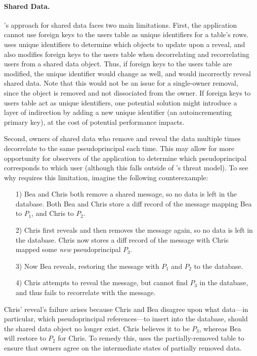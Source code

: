 \paragraph{Shared Data.}
\sys's approach for shared data faces two main limitations. First, the
application cannot use foreign keys to the users table as unique identifiers for
a table's rows. \sys uses unique identifiers to determine which objects to
update upon a reveal, and also modifies foreign keys to the users table when
decorrelating and recorrelating users from a shared data object. Thus, if
foreign keys to the users table are modified, the unique identifier would change
as well, and \sys would incorrectly reveal shared data.
%
Note that this would not be an issue for a single-owner removal, since the
object is removed and not dissociated from the owner.
%
If foreign keys to users table act as unique identifiers, one potential solution
might introduce a layer of indirection by adding a new unique identifier (\eg an
autoincrementing primary key), at the cost of potential performance impacts.

Second, owners of shared data who remove and reveal the data multiple times 
decorrelate to the same pseudoprincipal each time. This may allow for more opportunity
for observers of the application to determine which pseudoprincipal corresponds
to which user (although this falls outside of \sys's threat model).
To see why \sys requires this limitation, imagine the following counterexample:
\begin{enumerate}
    \item[1)] Bea and Chris both remove a shared message, so no data is left in
        the database. Both Bea and Chris store a diff record of the message mapping Bea to $P_1$,
        and Chris to $P_2$. 
       
    \item[2)] Chris first reveals and then removes the message again, so no data
        is left in the database. Chris now stores a diff record of the message
        with Chris mapped some \emph{new} pseudoprincipal $P_3$.
        
    \item[3)] Now Bea reveals, restoring the message with $P_1$ and $P_2$ to
        the database. 
        
    \item[4)] Chris attempts to reveal the message, but cannot find $P_3$ in the
        database, and thus fails to recorrelate with the message. 
\end{enumerate}
%
Chris' reveal's failure arises because Chris and Bea disagree upon what
data---in particular, which pseudoprincipal references---to insert into the
database, should the shared data object no longer exist. Chris believes it to be
$P_3$, whereas Bea will restore to $P_2$ for Chris. 
To remedy this, \sys uses the partially-removed table to ensure that owners
agree on the intermediate states of partially removed data.
%


